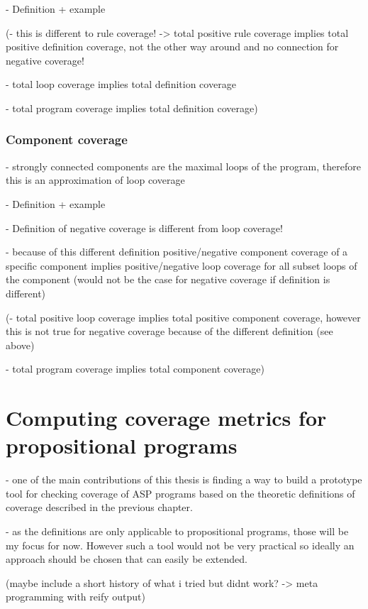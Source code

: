 - Definition + example

(- this is different to rule coverage! -> total positive rule coverage implies total positive definition coverage, not the other 
way around and no connection for negative coverage!

- total loop coverage implies total definition coverage

- total program coverage implies total definition coverage)

\subsection{Component coverage}
\label{subsec:Coverage cetrics/Branch-like coverage/Component coverage}
- strongly connected components are the maximal loops of the program, therefore this is an approximation of loop coverage

- Definition + example

- Definition of negative coverage is different from loop coverage!

- because of this different definition positive/negative component coverage of a specific component implies positive/negative loop 
coverage for all subset loops of the component (would not be the case for negative coverage if definition is different)

(- total positive loop coverage implies total positive component coverage, however this is not true for negative coverage because 
of the different definition (see above)

- total program coverage implies total component coverage)

\chapter{Computing coverage metrics for propositional programs}
\label{ch:Computing coverage metrics for propositional programs}
- one of the main contributions of this thesis is finding a way to build a prototype tool for checking coverage of ASP programs 
based on the theoretic definitions of coverage described in the previous chapter.

- as the definitions are only applicable to propositional programs, those will be my focus for now. However such a tool would not 
be very practical so ideally an approach should be chosen that can easily be extended.

(maybe include a short history of what i tried but didnt work? -> meta programming with reify output)

